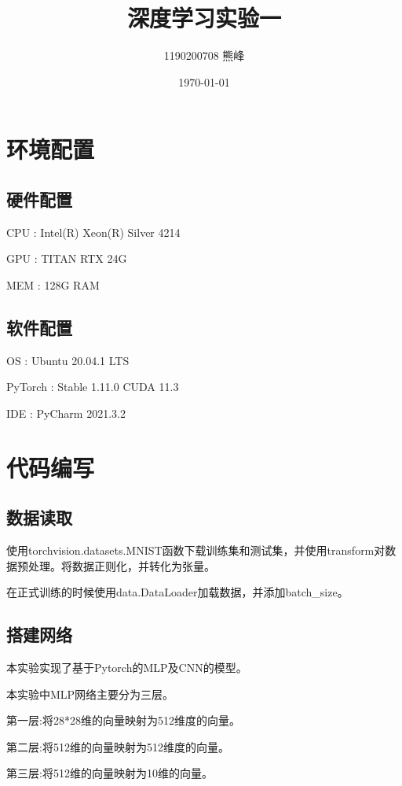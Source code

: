 \documentclass[UTF8]{ctexart}
\title{深度学习实验一}
\author{1190200708 熊峰}
\date{\today}
\begin{document}
 
\maketitle 

\newpage
\tableofcontents
\newpage

\section{环境配置}
\subsection{硬件配置}
CPU : Intel(R) Xeon(R) Silver 4214 \par
GPU : TITAN RTX 24G \par
MEM : 128G RAM  \par
\subsection{软件配置}
OS : Ubuntu 20.04.1 LTS \par
PyTorch : Stable 1.11.0  CUDA 11.3 \par
IDE : PyCharm 2021.3.2 \par


\section{代码编写}

\subsection{数据读取}
使用torchvision.datasets.MNIST函数下载训练集和测试集，并使用transform对数据预处理。将数据正则化，并转化为张量。\par
在正式训练的时候使用data.DataLoader加载数据，并添加batch\_size。\par 
\subsection{搭建网络}
本实验实现了基于Pytorch的MLP及CNN的模型。\par
本实验中MLP网络主要分为三层。\par
第一层:将28*28维的向量映射为512维度的向量。\par
第二层:将512维的向量映射为512维度的向量。\par
第三层:将512维的向量映射为10维的向量。 \par
\end{document}
